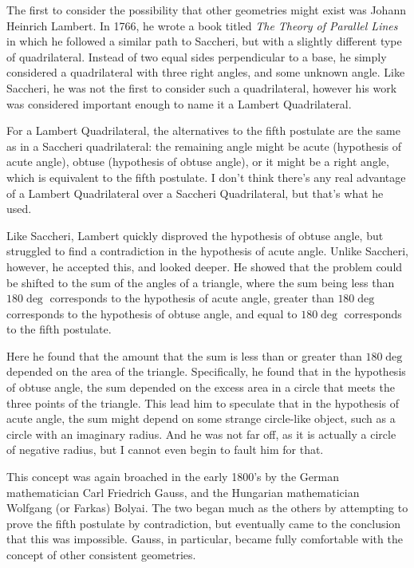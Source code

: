 \documentclass[12pt]{article}
\begin{document}
The first to consider the possibility that other geometries might exist was Johann Heinrich Lambert. In 1766, he wrote a book titled \textit{The Theory of Parallel Lines} in which he followed a similar path to Saccheri, but with a slightly different type of quadrilateral. Instead of two equal sides perpendicular to a base, he simply considered a quadrilateral with three right angles, and some unknown angle. Like Saccheri, he was not the first to consider such a quadrilateral, however his work was considered important enough to name it a Lambert Quadrilateral.

For a Lambert Quadrilateral, the alternatives to the fifth postulate are the same as in a Saccheri quadrilateral: the remaining angle might be acute (hypothesis of acute angle), obtuse (hypothesis of obtuse angle), or it might be a right angle, which is equivalent to the fifth postulate. I don't think there's any real advantage of a Lambert Quadrilateral over a Saccheri Quadrilateral, but that's what he used.

Like Saccheri, Lambert quickly disproved the hypothesis of obtuse angle, but struggled to find a contradiction in the hypothesis of acute angle. Unlike Saccheri, however, he accepted this, and looked deeper. He showed that the problem could be shifted to the sum of the angles of a triangle, where the sum being less than $180\deg$ corresponds to the hypothesis of acute angle, greater than $180\deg$ corresponds to the hypothesis of obtuse angle, and equal to $180\deg$ corresponds to the fifth postulate.

Here he found that the amount that the sum is less than or greater than $180\deg$ depended on the area of the triangle. Specifically, he found that in the hypothesis of obtuse angle, the sum depended on the excess area in a circle that meets the three points of the triangle. This lead him to speculate that in the hypothesis of acute angle, the sum might depend on some strange circle-like object, such as a circle with an imaginary radius. And he was not far off, as it is actually a circle of negative radius, but I cannot even begin to fault him for that.

This concept was again broached in the early 1800's by the German mathematician Carl Friedrich Gauss, and the Hungarian mathematician Wolfgang (or Farkas) Bolyai. The two began much as the others by attempting to prove the fifth postulate by contradiction, but eventually came to the conclusion that this was impossible. Gauss, in particular, became fully comfortable with the concept of other consistent geometries.
\end{document}

